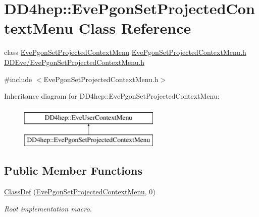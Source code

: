 \hypertarget{class_d_d4hep_1_1_eve_pgon_set_projected_context_menu}{}\section{D\+D4hep\+:\+:Eve\+Pgon\+Set\+Projected\+Context\+Menu Class Reference}
\label{class_d_d4hep_1_1_eve_pgon_set_projected_context_menu}


class \hyperlink{class_d_d4hep_1_1_eve_pgon_set_projected_context_menu}{Eve\+Pgon\+Set\+Projected\+Context\+Menu} \hyperlink{_eve_pgon_set_projected_context_menu_8h}{Eve\+Pgon\+Set\+Projected\+Context\+Menu.\+h} \hyperlink{_eve_pgon_set_projected_context_menu_8h}{D\+D\+Eve/\+Eve\+Pgon\+Set\+Projected\+Context\+Menu.\+h}  




{\ttfamily \#include $<$Eve\+Pgon\+Set\+Projected\+Context\+Menu.\+h$>$}

Inheritance diagram for D\+D4hep\+:\+:Eve\+Pgon\+Set\+Projected\+Context\+Menu\+:\begin{figure}[H]
\begin{center}
\leavevmode
\includegraphics[height=2.000000cm]{class_d_d4hep_1_1_eve_pgon_set_projected_context_menu}
\end{center}
\end{figure}
\subsection*{Public Member Functions}
\begin{DoxyCompactItemize}
\item 
\hyperlink{class_d_d4hep_1_1_eve_pgon_set_projected_context_menu_aea367eff04cd968f43590dd69a718ffb}{Class\+Def} (\hyperlink{class_d_d4hep_1_1_eve_pgon_set_projected_context_menu}{Eve\+Pgon\+Set\+Projected\+Context\+Menu}, 0)
\begin{DoxyCompactList}\small\item\em Root implementation macro. \end{DoxyCompactList}\end{DoxyCompactItemize}
